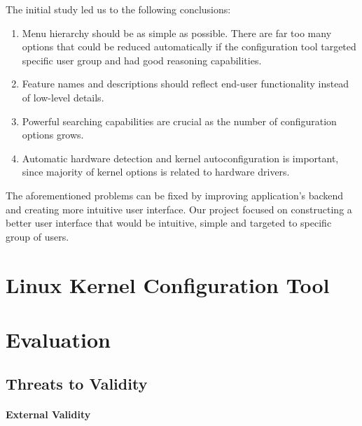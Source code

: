 \documentclass{chi2009}
\begin{document}

The initial study led us to the following conclusions:
\begin{enumerate}
\item Menu hierarchy should be as simple as possible. There are far too many options that could be reduced automatically if the configuration tool targeted specific user group and had good reasoning capabilities.
\item Feature names and descriptions should reflect end-user functionality instead of low-level details.
\item Powerful searching capabilities are crucial as the number of configuration options grows.
\item Automatic hardware detection and kernel autoconfiguration is important, since majority of kernel options is related to hardware drivers.
\end{enumerate}

The aforementioned problems can be fixed by improving application's backend and creating more intuitive user interface. Our project focused on constructing a better user interface that would be intuitive, simple and targeted to specific group of users.

\section{Linux Kernel Configuration Tool}\label{sec:lkc}






\section{Evaluation}\label{sec:evaluation}


\subsection{Threats to Validity}

\paragraph{External Validity}
\end{document}
